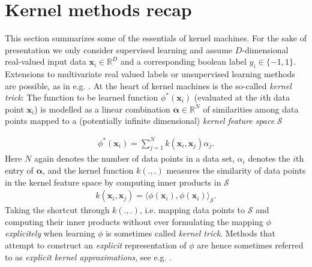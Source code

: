 \documentclass{article} %
\newcommand{\R}{\ensuremath{\mathds{R}}}
\newcommand{\va}{\boldsymbol{\alpha}}
\newcommand{\Bx}{\mathbf{x}}
\begin{document}
\section{Kernel methods recap}\label{sec:kernels}
This section summarizes some of the essentials of kernel machines. For the sake of presentation we only consider supervised learning and assume $D$-dimensional real-valued input data $\Bx_i\in\R^D$ and a corresponding boolean label $y_i\in\{-1,1\}$. Extensions to multivariate real valued labels or unsupervised learning methods are possible, as in e.g.  \cite{Lopez-Paz2014}. At the heart of kernel machines is the so-called {\em kernel trick}: The function to be learned function $\phi^*(\Bx_i) $ (evaluated at the $i$th data point $\Bx_i$) is modelled as a linear combination $\va\in\R^N$ of similarities among data points mapped to a (potentially infinite dimensional) {\em kernel feature space} $\mathcal{S}$

\begin{align}\label{eq:kernel_trick}
\phi^*(\Bx_i)=\sum_{j=1}^N k(\Bx_i,\Bx_j)\alpha_j.
\end{align}
Here $N$ again denotes the number of data points in a data set, $\alpha_i$ denotes the $i$th entry of $\va$, and the kernel function $k(.,.)$ measures the similarity of data points in the kernel feature space by computing inner products in $\mathcal{S}$
\begin{align}\label{eq:kernel_function}
k(\Bx_i,\Bx_j)=\langle \phi(\Bx_i), \phi(\Bx_i)\rangle_{\mathcal{S}}.
\end{align}
%
Taking the shortcut through $k(.,.)$, i.e. mapping data points to $\mathcal{S}$ and computing their inner products without ever formulating the mapping $\phi$ {\em explicitely} when learning $\phi$ is sometimes called {\em kernel trick}. Methods that attempt to construct an {\em explicit} representation of $\phi$ are hence sometimes referred to as {\em explicit kernel approximations}, see e.g. \cite{Dai2014}. 
\end{document}
